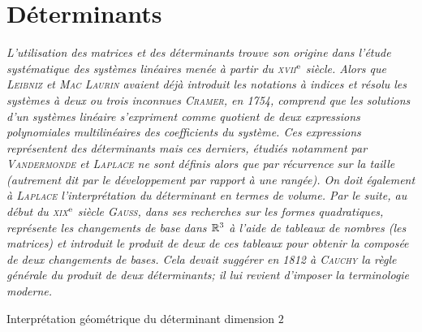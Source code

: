 \chapter{Déterminants}

\textsl{L'utilisation des matrices et des déterminants trouve son origine dans l'étude systématique des systèmes linéaires menée à partir du \textsc{xvii}$^{\mathrm{e}}$ siècle. Alors que \textsc{Leibniz} et \textsc{Mac Laurin} avaient déjà introduit les notations à indices et résolu les systèmes à deux ou trois inconnues \textsc{Cramer}, en 1754, comprend que les solutions d'un systèmes linéaire s'expriment comme quotient de deux expressions polynomiales multilinéaires des coefficients du système. Ces expressions représentent des déterminants mais ces derniers, étudiés notamment par \textsc{Vandermonde} et \textsc{Laplace} ne sont définis alors que par récurrence sur la taille (autrement dit par le développement par rapport à une rangée). On doit également à \textsc{Laplace} l'interprétation du déterminant en termes de volume. Par le suite, au début du \textsc{xix}$^{\mathrm{e}}$ siècle \textsc{Gauss}, dans ses recherches sur les formes quadratiques, représente les changements de base dans $\mathbb{R}^3$ à l'aide de tableaux de nombres (les matrices) et introduit le produit de deux de ces tableaux pour obtenir la composée de deux changements de bases. Cela devait suggérer en 1812 à \textsc{Cauchy} la règle générale du produit de deux déterminants; il lui revient d'imposer la terminologie moderne.}

\begin{marginfigure}[-8.2cm]
    \caption*{\centering Interprétation géométrique du déterminant dimension $2$}
   
\end{marginfigure}


